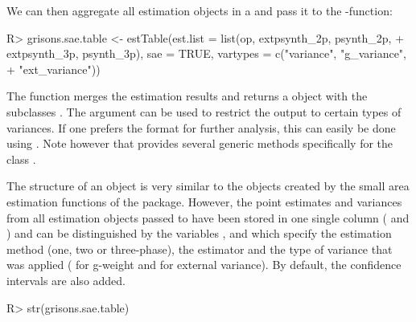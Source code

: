 We can then aggregate all estimation objects in a  and pass it to the -function:

\begin{small}
\begin{Schunk}
\begin{Sinput}
R> grisons.sae.table <- estTable(est.list = list(op, extpsynth_2p, psynth_2p,
+    extpsynth_3p, psynth_3p), sae = TRUE, vartypes = c("variance", "g_variance", 
+    "ext_variance"))
\end{Sinput}
\end{Schunk}
\end{small}

The function merges the estimation results and returns a  object with the subclasses . The  argument can be used to restrict the  output to certain types of variances. If one prefers the  format for further analysis, this can easily be done using . Note however that  provides several  generic methods specifically for the class .

The structure of an  object is very similar to the objects created by the small area estimation functions of the package. However, the point estimates and variances from all estimation objects passed to  have been stored in one single column ( and ) and can be distinguished by the variables ,  and  which specify the estimation method (one, two or three-phase), the estimator and the type of variance that was applied ( for g-weight and  for external variance). By default, the confidence intervals are also added.

\begin{small}
\begin{Schunk}
\begin{Sinput}
R> str(grisons.sae.table)
\end{Sinput}
\end{Schunk}
\end{small}

